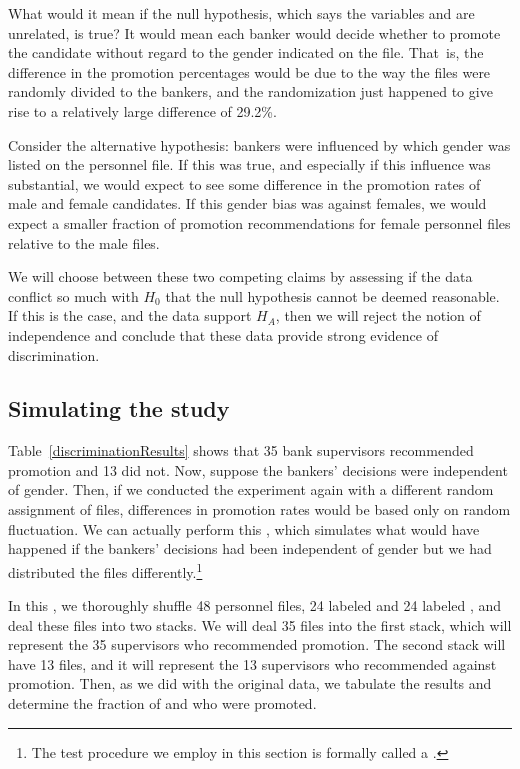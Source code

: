 What would it mean if the null hypothesis, which says the variables  and  are unrelated, is true? It would mean each banker would decide whether to promote the candidate without regard to the gender indicated on the file. That~is, the difference in the promotion percentages would be due to the way the files were randomly divided to the bankers, and the randomization just happened to give rise to a relatively large difference of 29.2\%.

Consider the alternative hypothesis: bankers were influenced by which gender was listed on the personnel file. If this was true, and especially if this influence was substantial, we would expect to see some difference in the promotion rates of male and female candidates. If this gender bias was against females, we would expect a smaller fraction of promotion recommendations for female personnel files relative to the male files.

We will choose between these two competing claims by assessing if the data conflict so much with $H_0$ that the null hypothesis cannot be deemed reasonable. If this is the case, and the data support $H_A$, then we will reject the notion of independence and conclude that these data provide strong evidence of discrimination.

\subsection{Simulating the study}
\label{simulatingTheStudy}

Table~\ref{discriminationResults} shows that 35 bank supervisors recommended promotion and 13 did not. Now, suppose the bankers' decisions were independent of gender. Then, if we conducted the experiment again with a different random assignment of files, differences in promotion rates would be based only on random fluctuation. We can actually perform this , which simulates what would have happened if the bankers' decisions had been independent of gender but we had distributed the files differently.\footnote{The test procedure we employ in this section is formally called a .}

In this , we thoroughly shuffle 48 personnel files, 24 labeled  and 24 labeled , and deal these files into two stacks. We will deal 35 files into the first stack, which will represent the 35 supervisors who recommended promotion. The second stack will have 13 files, and it will represent the 13 supervisors who recommended against promotion. Then, as we did with the original data, we tabulate the results and determine the fraction of  and  who were promoted.

